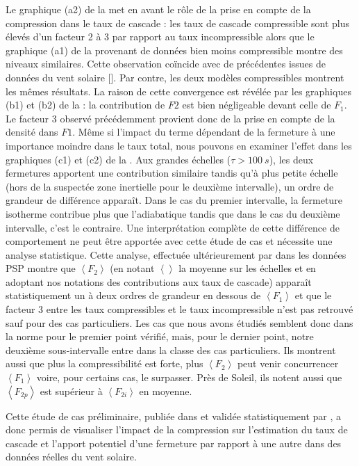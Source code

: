  Le graphique (a2) de la  met en avant le rôle de la prise en compte de la compression dans le taux de cascade : les taux de cascade compressible sont plus élevés d'un facteur 2 à 3 par rapport au taux incompressible alors que le graphique (a1) de la  provenant de données bien moins compressible montre des niveaux similaires. Cette observation coïncide avec de précédentes issues de données du vent solaire [\cite{banerjee_scaling_2016,hadid_energy_2017,andres_evolution_2021}]. Par contre, les deux modèles compressibles montrent les mêmes résultats. La raison de cette convergence est révélée par les graphiques (b1) et (b2) de la  : la contribution de $F2$ est bien négligeable devant celle de $F_1$. Le facteur 3 observé précédemment provient donc de la prise en compte de la densité dans $F1$.  Même si l'impact du terme dépendant de la fermeture à une importance moindre dans le taux total, nous pouvons en examiner l'effet dans les graphiques (c1) et (c2) de la . Aux grandes échelles ($\tau > \SI{100}{s}$), les deux fermetures apportent une contribution similaire tandis qu'à plus petite échelle (hors de la suspectée zone inertielle pour le deuxième intervalle), un ordre de grandeur de différence apparaît. Dans le cas du premier intervalle, la fermeture isotherme contribue plus que l'adiabatique tandis que dans le cas du deuxième intervalle, c'est le contraire. Une interprétation complète de cette différence de comportement ne peut être apportée avec cette étude de cas et nécessite une analyse statistique. Cette analyse, effectuée ultérieurement par \cite{brodiano_statistical_2022} dans les données \ac{PSP} montre que $\left<F_2\right>$ (en notant $\left<\right>$ la moyenne sur les échelles et en adoptant nos notations des contributions aux taux de cascade) apparaît statistiquement un à deux ordres de grandeur en dessous de $\left<F_1\right>$ et que le facteur $\num{3}$ entre les taux compressibles et le taux incompressible n'est pas retrouvé sauf pour des cas particuliers. Les cas que nous avons étudiés semblent donc dans la norme pour le premier point vérifié, mais, pour le dernier point, notre deuxième sous-intervalle entre dans la classe des cas particuliers. Ils montrent aussi que plus la compressibilité est forte, plus $\left<F_2\right>$ peut venir concurrencer $\left<F_1\right>$ voire, pour certains cas, le surpasser. Près de Soleil, ils notent aussi que $\left<F_{2p}\right>$ est supérieur à $\left<F_{2i}\right>$ en moyenne.

Cette étude de cas préliminaire, publiée dans \cite{simon_general_2021} et validée statistiquement par \cite{brodiano_statistical_2022}, a donc permis de visualiser l'impact de la compression sur l'estimation du taux de cascade et l'apport potentiel d'une fermeture par rapport à une autre dans des données réelles du vent solaire. 

